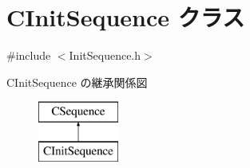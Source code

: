 \hypertarget{class_c_init_sequence}{}\section{C\+Init\+Sequence クラス}
\label{class_c_init_sequence}


{\ttfamily \#include $<$Init\+Sequence.\+h$>$}

C\+Init\+Sequence の継承関係図\begin{figure}[H]
\begin{center}
\leavevmode
\includegraphics[height=2.000000cm]{class_c_init_sequence}
\end{center}
\end{figure}
